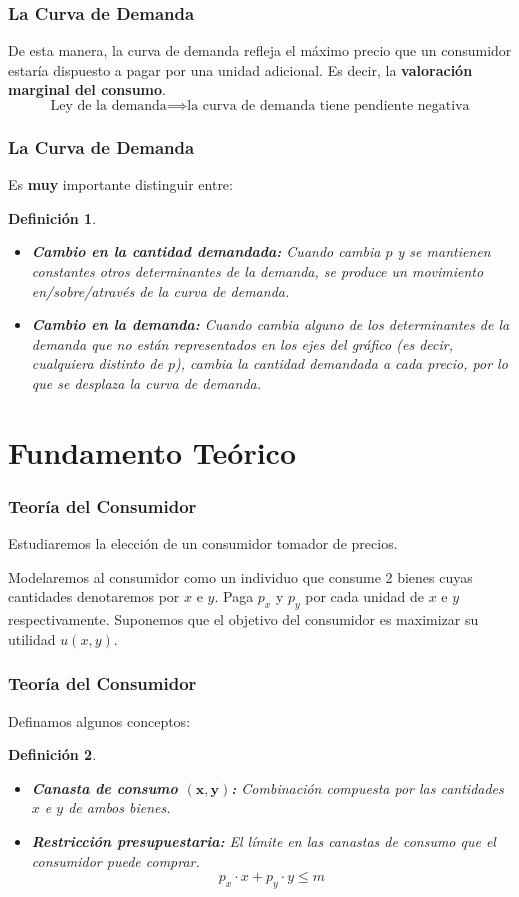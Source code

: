 \documentclass{beamer}
\newtheorem{mydef}{Definición}
\newcommand{\peq}[1]{{\scriptscriptstyle{#1}}}
\newcommand{\rp}[1]{\left(#1\right)}
\begin{document}
		\begin{frame}
			\frametitle{La Curva de Demanda}
			De esta manera, la curva de demanda refleja el máximo precio que un consumidor estaría dispuesto a pagar por una unidad adicional. Es decir, la \textbf{valoración marginal del consumo}. $$\text{Ley de la demanda}\implies\text{la curva de demanda tiene pendiente negativa}$$
		\end{frame}
		
		\begin{frame}
			\frametitle{La Curva de Demanda}
			Es \textbf{muy} importante distinguir entre:
			\begin{mydef}
				\begin{itemize}
					\item \textbf{Cambio en la cantidad demandada:} Cuando cambia $p$ y se mantienen constantes otros determinantes de la demanda, se produce un movimiento en/sobre/através de la curva de demanda.
					\item \textbf{Cambio en la demanda:} Cuando cambia alguno de los determinantes de la demanda que no están representados en los ejes del gráfico (es decir, cualquiera distinto de $p$), cambia la cantidad demandada a cada precio, por lo que se desplaza la curva de demanda.
				\end{itemize}
			\end{mydef}
		\end{frame}
		
	\section{Fundamento Teórico}

		\begin{frame}
			\frametitle{Teoría del Consumidor}
			Estudiaremos la elección de un consumidor tomador de precios.
			
			Modelaremos al consumidor como un individuo que consume 2 bienes cuyas cantidades denotaremos por $x$ e $y$. Paga $p_\peq{x}$ y $p_\peq{y}$ por cada unidad de $x$ e $y$ respectivamente. Suponemos que el objetivo del consumidor es maximizar su utilidad $u\rp{x,y}$.
		\end{frame}	

		\begin{frame}
			\frametitle{Teoría del Consumidor}
			Definamos algunos conceptos:
			\begin{mydef}
				\begin{itemize}
					\item \textbf{Canasta de consumo $\mathbf{\rp{x,y}}$:} Combinación compuesta por las cantidades $x$ e $y$ de ambos bienes.
					\item \textbf{Restricción presupuestaria:} El límite en las canastas de consumo que el consumidor puede comprar. $$p_\peq{x}\cdot x + p_\peq{y}\cdot y \leq m$$
				\end{itemize}
			\end{mydef}
		\end{frame}	
\end{document}
